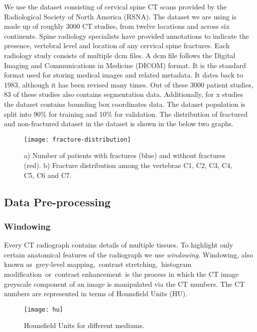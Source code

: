 \documentclass[pdflatex,sn-mathphys]{sn-jnl}%
\theoremstyle{thmstyleone}%
\theoremstyle{thmstyletwo}%
\theoremstyle{thmstylethree}%
\begin{document}
We use the dataset consisting of cervical spine CT scans provided by the Radiological Society of North America (RSNA)\cite{rsna-url}. The dataset we are using is made up of roughly 3000 CT studies, from twelve locations and across six continents. Spine radiology specialists have provided annotations to indicate the presence, vertebral level and location of any cervical spine fractures. Each radiology study consists of multiple dcm files. A dcm file follows the Digital Imaging and Communications in Medicine (DICOM) format. It is the standard format used for storing medical images and related metadata. It dates back to 1983, although it has been revised many times. Out of these 3000 patient studies, 83 of these studies also contains segmentation data. Additionally, for x studies the dataset contains bounding box coordinates data. The dataset population is split into 90\% for training and 10\% for validation. The distribution of fractured and non-fractured dataset in the dataset is shown in the below two graphs.

\begin{figure}[H]
\centering
 \begin{minipage}[c]{1\textwidth}
    \texttt{[image: fracture-distribution]}
    \caption{\centering\footnotesize{a) Number of patients with fractures (blue) and without fractures (red). b) Fracture distribution among the vertebrae C1, C2, C3, C4, C5, C6 and C7. }}
    \label{fig:mesh1}
\end{minipage}
\end{figure}

\subsection{Data Pre-processing}

\subsubsection{Windowing}

Every CT radiograph contains details of multiple tissues. To highlight only certain anatomical features of the radiograph we use \emph{windowing}. Windowing, also known as grey-level mapping, contrast stretching, histogram modification or contrast enhancement is the process in which the CT image greyscale component of an image is manipulated via the CT numbers. The CT numbers are represented in terms of Hounsfield Units (HU).

\vspace*{-5mm}
\begin{figure}[H]
 \begin{minipage}[c]{1\textwidth}
 \centering
    \texttt{[image: hu]}
    \caption{\centering\footnotesize{ Hounsfield Units for different mediums. }}
    \label{fig:mesh2}
\end{minipage}
\end{figure}
\end{document}
